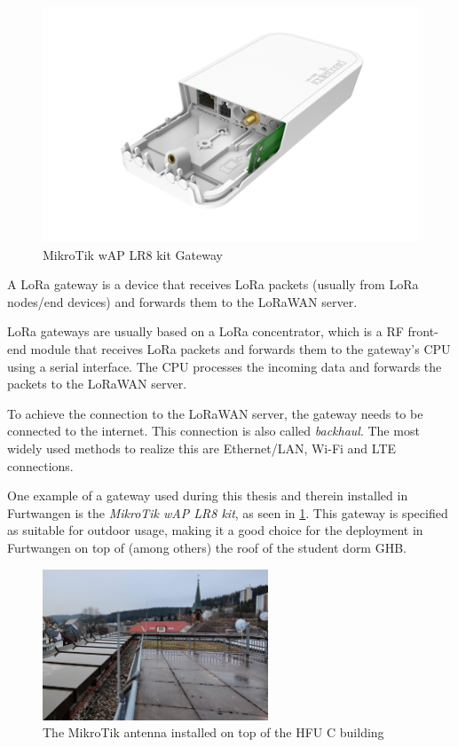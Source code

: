 \begin{figure}[h]
    \centering
    \includegraphics[width=.6\textwidth]{pictures/hardware/gateways/mikrotik-lr8-kit.png}
    \caption{MikroTik wAP LR8 kit Gateway~\protect\cite{the_things_industries_bv_lorawan_nodate}}\label{pic:mikrotik-lr8-kit-gateway}
\end{figure}

A \ac{LoRa} gateway is a device that receives \ac{LoRa} packets (usually from \ac{LoRa} nodes/end devices) and forwards them to the \ac{LoRaWAN} server.

\ac{LoRa} gateways are usually based on a \ac{LoRa} concentrator, which is a \ac{RF} front-end module that receives \ac{LoRa} packets and forwards them to the gateway's \ac{CPU} using a serial interface.
The \ac{CPU} processes the incoming data and forwards the packets to the \ac{LoRaWAN} server.

To achieve the connection to the \ac{LoRaWAN} server, the gateway needs to be connected to the internet.
This connection is also called \emph{backhaul}.
The most widely used methods to realize this are Ethernet/\ac{LAN}, Wi-Fi and \ac{LTE} connections.

One example of a gateway used during this thesis and therein installed in Furtwangen is the \emph{MikroTik wAP LR8 kit}, as seen in \cref{pic:mikrotik-lr8-kit-gateway}.
This gateway is specified as suitable for outdoor usage, making it a good choice for the deployment in Furtwangen on top of (among others) the roof of the student dorm \ac{GHB}.

\begin{figure}[h]
    \centering
    \includegraphics[width=0.6\textwidth]{pictures/hardware/gateway-deployment/mikrotik-antenna-c-building.jpg}
    \caption{The MikroTik antenna installed on top of the \ac{HFU} C building}\label{pic:mikrotik-antenna-c-building}
\end{figure}

